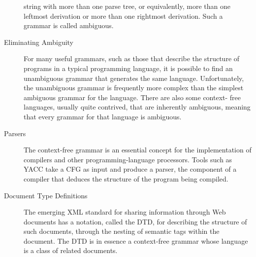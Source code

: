 \documentclass[]{article}
\begin{document}
\begin{description}
    string with more than one parse tree, or equivalently, more than one
    leftmost derivation or more than one rightmost derivation. Such a grammar is
    called ambiguous.
    \item[Eliminating Ambiguity] For many useful grammars, such as those that
    describe the structure of programs in a typical programming language, it is
    possible to find an unambiguous grammar that generates the same language.
    Unfortunately, the unambiguous grammar is frequently more complex than the
    simplest ambiguous grammar for the language. There are also some context-
    free languages, usually quite contrived, that are inherently ambiguous,
    meaning that every grammar for that language is ambiguous.
    \item[Parsers] The context-free grammar is an essential concept for the
    implementation of compilers and other programming-language processors. Tools
    such as YACC take a CFG as input and produce a parser, the component of a
    compiler that deduces the structure of the program being compiled.
    \item[Document Type Definitions] The emerging XML standard for sharing
    information through Web documents has a notation, called the DTD, for
    describing the structure of such documents, through the nesting of semantic
    tags within the document. The DTD is in essence a context-free grammar whose
    language is a class of related documents.
  \end{description}
\end{document}
